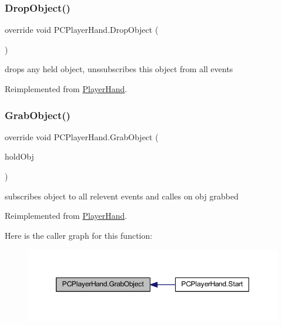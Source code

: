 \subsubsection{\texorpdfstring{Drop\+Object()}{DropObject()}}
{\footnotesize\ttfamily override void P\+C\+Player\+Hand.\+Drop\+Object (\begin{DoxyParamCaption}{ }\end{DoxyParamCaption})\hspace{0.3cm}{\ttfamily [virtual]}}



drops any held object, unssubscribes this object from all events 



Reimplemented from \mbox{\hyperlink{class_player_hand_a3b127b846b420ef37cba3a3a8de68e78}{Player\+Hand}}.

\mbox{\label{class_p_c_player_hand_a08da28b459501727d269733569559c24}} 
\subsubsection{\texorpdfstring{Grab\+Object()}{GrabObject()}}
{\footnotesize\ttfamily override void P\+C\+Player\+Hand.\+Grab\+Object (\begin{DoxyParamCaption}\item[{\mbox{\hyperlink{interface_i_holdable_object}{I\+Holdable\+Object}}}]{hold\+Obj }\end{DoxyParamCaption})\hspace{0.3cm}{\ttfamily [virtual]}}



subscribes object to all relevent events and calles on obj grabbed 



Reimplemented from \mbox{\hyperlink{class_player_hand_a64a86af904a77f4a0b92d72bd5fdf43c}{Player\+Hand}}.

Here is the caller graph for this function\+:
\nopagebreak
\begin{figure}[H]
\begin{center}
\leavevmode
\includegraphics[width=350pt]{class_p_c_player_hand_a08da28b459501727d269733569559c24_icgraph}
\end{center}
\end{figure}
\mbox{\label{class_p_c_player_hand_a81d7137403650fb8da125b6356d50496}} 
